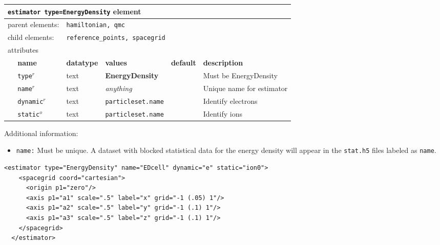 \FloatBarrier
\begin{table}[h]
\begin{center}
\begin{tabularx}{\textwidth}{l l l l l l }
\hline
\multicolumn{6}{l}{\texttt{estimator type=EnergyDensity} element} \\
\hline
\multicolumn{2}{l}{parent elements:} & \multicolumn{4}{l}{\texttt{hamiltonian, qmc}}\\
\multicolumn{2}{l}{child  elements:} & \multicolumn{4}{l}{\texttt{reference\_points, spacegrid}}\\
\multicolumn{2}{l}{attributes}  & \multicolumn{4}{l}{}\\
   &   \bfseries name     & \bfseries datatype & \bfseries values & \bfseries default   & \bfseries description \\
   & \texttt{type}$^r$    &  text              & \textbf{EnergyDensity}    &                  & Must be EnergyDensity     \\
   & \texttt{name}$^r$    &  text              & \textit{anything}         &                  & Unique name for estimator \\
   & \texttt{dynamic}$^r$ &  text              & \texttt{particleset.name} &                  & Identify electrons \\
   & \texttt{static}$^o$  &  text              & \texttt{particleset.name} &                  & Identify ions  \\
   
  \hline
\end{tabularx}
\end{center}
\end{table}
\FloatBarrier

Additional information:
\begin{itemize}
  \item{\texttt{name:}  Must be unique.  A dataset with blocked statistical data for the energy density will appear in the \texttt{stat.h5} files labeled as \texttt{name}.}
\end{itemize}


\begin{lstlisting}[caption=Energy density estimator accumulated on a 20x10x10 grid over the simulation cell.]
  <estimator type="EnergyDensity" name="EDcell" dynamic="e" static="ion0">
    <spacegrid coord="cartesian">
      <origin p1="zero"/>
      <axis p1="a1" scale=".5" label="x" grid="-1 (.05) 1"/>
      <axis p1="a2" scale=".5" label="y" grid="-1 (.1) 1"/>
      <axis p1="a3" scale=".5" label="z" grid="-1 (.1) 1"/>
    </spacegrid>
  </estimator>
\end{lstlisting}


